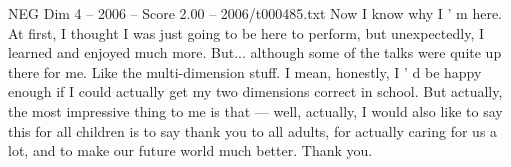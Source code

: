 \begin{textsample}{NEG Dim 4 – 2006 – Score 2.00 – 2006/t000485.txt}
Now I know why I ' m here.
At first, I thought I was just going to be here to perform, but unexpectedly, I learned and enjoyed much more.
But... although some of the talks were quite up there for me.
Like the multi-dimension stuff.
I mean, honestly, I ' d be happy enough if I could actually get my two dimensions correct in school.
But actually, the most impressive thing to me is that — well, actually, I would also like to say this for all children is to say thank you to all adults, for actually caring for us a lot, and to make our future world much better.
Thank you.

\end{textsample}
